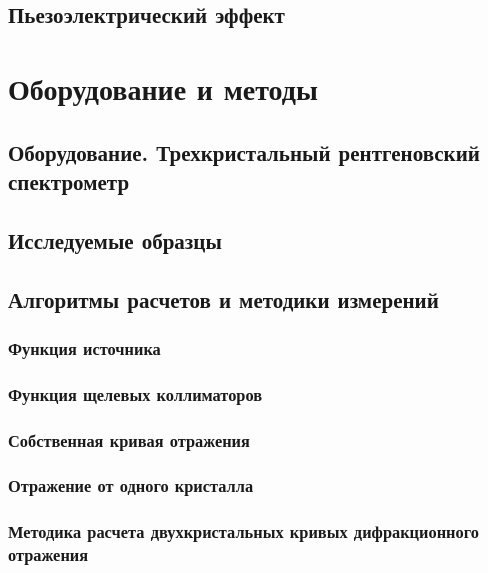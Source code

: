 \documentclass[pdftex,a4paper,14pt,english,russian]{extarticle}
\numberwithin{equation}{subsection}
\newcounter{subsubsubsection}[subsubsection]
\begin{document}
  \subsection{Пьезоэлектрический эффект}
    

\newpage
\section{Оборудование и методы}
  \subsection{Оборудование. Трехкристальный рентгеновский спектрометр}
    
  \subsection{Исследуемые образцы}
      
  \subsection{Алгоритмы расчетов и методики измерений}
    
    \subsubsection{Функция источника}
      
    \subsubsection{Функция щелевых коллиматоров}
      
    \subsubsection{Собственная кривая отражения}
      
    \subsubsection{Отражение от одного кристалла}
      
    \subsubsection{Методика расчета двухкристальных кривых дифракционного отражения}
      
      
\end{document}
